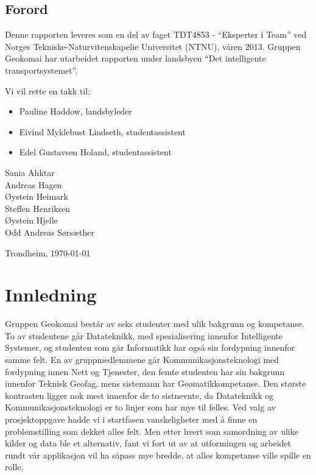 \documentclass[a4paper,norsk,oneside]{book}
\newcommand{\thesisAuthor}{Sania Ahktar\\Andreas Hagen\\Øystein Heimark\\Steffen Henriksen\\Øystein Hjelle\\Odd Andreas Sørsæther}
\begin{document}



\clearpage

\section*{Forord}



\vspace{1cm}

Denne rapporten leveres som en del av faget TDT4853 - “Eksperter i Team” ved Norges Tekniske-Naturvitenskapelie Universitet (NTNU), våren 2013. Gruppen Geokomai har utarbeidet rapporten under landsbyen “Det intelligente transportsystemet”. 

Vi vil rette en takk til:
\begin{itemize}	
\item Pauline Haddow, landsbyleder
\item Eivind Myklebust Lindseth, studentassistent
\item Edel Gustavsen Holand, studentassistent
\end {itemize}




\vfill

\hfill \thesisAuthor

\hfill Trondheim, \today

\clearpage

\tableofcontents

\listoffigures


\mainmatter

\chapter{Innledning}
\label{cha:Introduction}
Gruppen Geokomai består av seks studenter med ulik bakgrunn og kompetanse. To av studentene går Datateknikk, med spesialisering innenfor Intelligente Systemer, og studenten som går Informatikk har også sin fordypning innenfor samme felt. En av gruppmedlemmene 
går Kommunikasjonsteknologi med fordypning innen Nett og Tjenester, den femte studenten har sin bakgrunn innenfor Teknisk Geofag, mens sistemann har Geomatikkompetanse. Den største kontrasten ligger nok mest innenfor de to sistnevnte, da Datateknikk og Kommunikasjonsteknologi er to linjer som har mye til felles. Ved valg av prosjektoppgave hadde vi i startfasen vanskeligheter med å finne en problemstilling som dekket alles felt. Men etter hvert som samordning av ulike kilder og data ble et alternativ, fant vi fort ut av at utformingen og arbeidet rundt vår applikasjon vil ha såpass mye bredde, at alles kompetanse ville spille en rolle.
\end{document}
